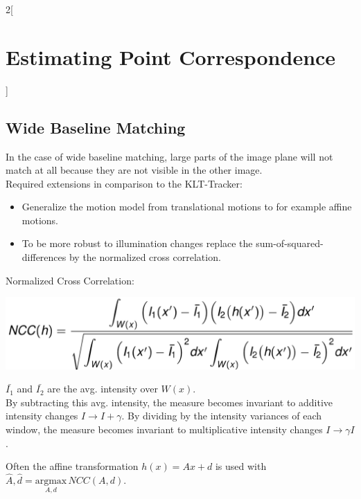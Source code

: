 \documentclass[oneside,fontsize=11pt,paper=a4]{scrartcl}
\newenvironment{myfigure}
  {\par\medskip\noindent\minipage{\linewidth}}
  {\endminipage\par\medskip}
\begin{document}
\begin{multicols}{2}[\section{Estimating Point Correspondence}]
\subsection{Wide Baseline Matching}
In the case of wide baseline matching, large parts of the image plane will not match at all because they are not visible in the other image.\\
Required extensions in comparison to the KLT-Tracker:
\begin{itemize}
	\item Generalize the motion model from translational motions to for example affine motions.
	\item To be more robust to illumination changes replace the sum-of-squared-differences by the normalized cross correlation.
\end{itemize}
Normalized Cross Correlation:
\begin{myfigure}
	\centering
	\includegraphics[width=1\linewidth]{Images/ncc.png}
\end{myfigure}
$\bar{I_1}$ and $\bar{I_2}$ are the avg. intensity over $W(x)$.\\
By subtracting this avg. intensity, the measure becomes invariant to additive intensity changes $I \rightarrow I + \gamma$.
By dividing by the intensity variances of each window, the measure becomes invariant to multiplicative intensity changes $I \rightarrow \gamma I$.\par
Often the affine transformation $h(x) = Ax + d$ is used with $\hat{A}, \hat{d} = \underset{A,d}{\mathrm{argmax}} \, NCC(A,d)$.
\end{multicols}
\end{document}
